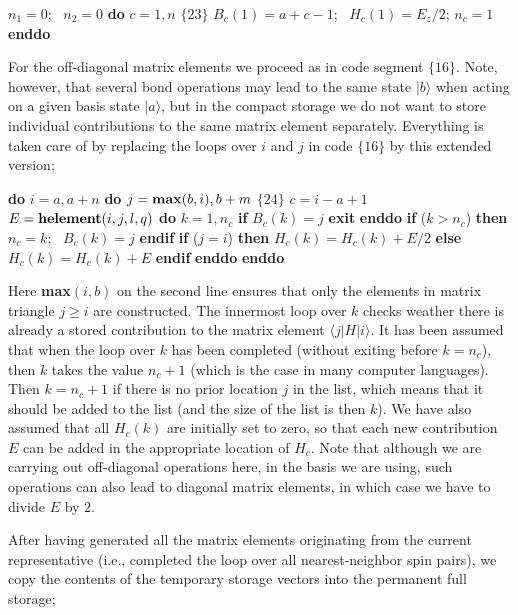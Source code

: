 \documentclass[draft,numberedheadings]{aipproc}
\newcommand{\code}{\null\vskip-2mm\noindent}
\newcommand{\br}{\hfill\break}
\newcommand{\cia}{\null\hskip5mm}
\newcommand{\cib}{\null\hskip10mm}
\newcommand{\cic}{\null\hskip15mm}
\begin{document}
{\code
\cia    $n_1=0$;~ $n_2=0$  \br
\cia    {\bf do} $c=1,n$                           \hfill $\{23\}$  \break              
\cib       $B_{c}(1)=a+c-1$;~ $H_{c}(1)=E_z/2$; $n_c=1$  \br    
\cia    {\bf enddo} 
\code}

\noindent
For the off-diagonal matrix elements we proceed as in code segment $\{16\}$. Note, however, that several bond operations may lead to the same state $|b\rangle$ when 
acting on a given basis state $|a\rangle$, but in the compact storage we do not want to store individual contributions to the same matrix element separately. 
Everything is taken care of by replacing the loops over $i$ and $j$ in code $\{16\}$ by this extended version;

{\code
\cia   {\bf do} $i=a,a+n$   \br
\cia   {\bf do} $j={\bf max}(b,i),b+m$                         \hfill $\{24\}$\break              
\cib       $c=i-a+1$  \br
\cib       $E={\bf helement}(i,j,l,q)$ \br
\cib       {\bf do} $k=1,n_c$           \br
\cic          {\bf if} $B_c(k)=j$ {\bf exit}    \br
\cib       {\bf enddo}  \br
\cib       {\bf if} ($k>n_c$) {\bf then} $n_c=k$;~ $B_{c}(k)=j$ {\bf endif} \br
\cib       {\bf if} ($j=i$) {\bf then} $H_{c}(k)=H_{c}(k)+E/2$ {\bf else} $H_{c}(k)=H_{c}(k)+E$ {\bf endif} \br       
\cia   {\bf enddo} \br
\cia   {\bf enddo}
\code}

\noindent
Here {\bf max}$(i,b)$ on the second line ensures that only the elements in matrix triangle $j\ge i$ are constructed. The innermost loop over $k$ checks weather 
there is already a stored contribution to the matrix element $\langle j|H|i\rangle$. It has been assumed that when the loop over $k$ has been completed 
(without exiting before $k=n_c$), then $k$ takes the value $n_c+1$ (which is the case in many computer languages). Then $k=n_c+1$ if there is no 
prior location $j$ in the list, which means that it should be added to the list (and the size of the list is then $k$). We have also assumed that all $H_{c}(k)$ 
are initially set to zero, so that each new contribution $E$ can be added in the appropriate location of $H_c$. Note that although we are carrying out 
off-diagonal operations here, in the basis we are using, such operations can also lead to diagonal matrix elements, in which case we have to divide $E$ by $2$.

After having generated all the matrix elements originating from the current representative (i.e., completed the loop over all nearest-neighbor spin pairs), 
we copy the contents of the temporary storage vectors into the permanent full storage;
\end{document}
